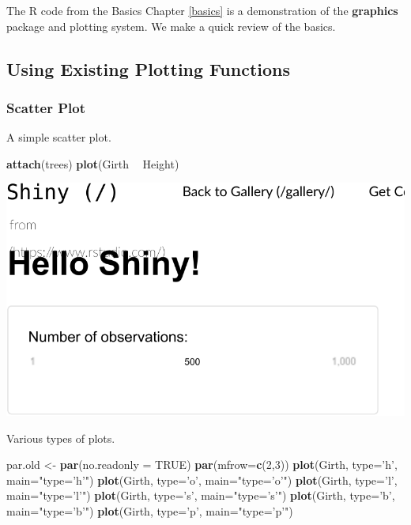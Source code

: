 \documentclass[]{book}
\newenvironment{Shaded}{\begin{snugshade}}{\end{snugshade}}
\newcommand{\DataTypeTok}[1]{\textcolor[rgb]{0.13,0.29,0.53}{#1}}
\newcommand{\DecValTok}[1]{\textcolor[rgb]{0.00,0.00,0.81}{#1}}
\newcommand{\KeywordTok}[1]{\textcolor[rgb]{0.13,0.29,0.53}{\textbf{#1}}}
\newcommand{\NormalTok}[1]{#1}
\newcommand{\OperatorTok}[1]{\textcolor[rgb]{0.81,0.36,0.00}{\textbf{#1}}}
\newcommand{\OtherTok}[1]{\textcolor[rgb]{0.56,0.35,0.01}{#1}}
\newcommand{\StringTok}[1]{\textcolor[rgb]{0.31,0.60,0.02}{#1}}
\theoremstyle{definition}
\theoremstyle{definition}
\theoremstyle{definition}
\theoremstyle{remark}
\begin{document}
The R code from the Basics Chapter \ref{basics} is a demonstration of the \textbf{graphics} package and plotting system.
We make a quick review of the basics.

\hypertarget{using-existing-plotting-functions}{%
\subsection{Using Existing Plotting Functions}\label{using-existing-plotting-functions}}

\hypertarget{scatter-plot}{%
\subsubsection{Scatter Plot}\label{scatter-plot}}

A simple scatter plot.

\begin{Shaded}
\begin{Highlighting}[]
\KeywordTok{attach}\NormalTok{(trees)}
\KeywordTok{plot}\NormalTok{(Girth }\OperatorTok{~}\StringTok{ }\NormalTok{Height)}
\end{Highlighting}
\end{Shaded}

\includegraphics[width=0.5\linewidth]{Rcourse_files/figure-latex/unnamed-chunk-263-1}

Various types of plots.

\begin{Shaded}
\begin{Highlighting}[]
\NormalTok{par.old <-}\StringTok{ }\KeywordTok{par}\NormalTok{(}\DataTypeTok{no.readonly =} \OtherTok{TRUE}\NormalTok{)}
\KeywordTok{par}\NormalTok{(}\DataTypeTok{mfrow=}\KeywordTok{c}\NormalTok{(}\DecValTok{2}\NormalTok{,}\DecValTok{3}\NormalTok{))}
\KeywordTok{plot}\NormalTok{(Girth, }\DataTypeTok{type=}\StringTok{'h'}\NormalTok{, }\DataTypeTok{main=}\StringTok{"type='h'"}\NormalTok{) }
\KeywordTok{plot}\NormalTok{(Girth, }\DataTypeTok{type=}\StringTok{'o'}\NormalTok{, }\DataTypeTok{main=}\StringTok{"type='o'"}\NormalTok{) }
\KeywordTok{plot}\NormalTok{(Girth, }\DataTypeTok{type=}\StringTok{'l'}\NormalTok{, }\DataTypeTok{main=}\StringTok{"type='l'"}\NormalTok{)}
\KeywordTok{plot}\NormalTok{(Girth, }\DataTypeTok{type=}\StringTok{'s'}\NormalTok{, }\DataTypeTok{main=}\StringTok{"type='s'"}\NormalTok{)}
\KeywordTok{plot}\NormalTok{(Girth, }\DataTypeTok{type=}\StringTok{'b'}\NormalTok{, }\DataTypeTok{main=}\StringTok{"type='b'"}\NormalTok{)}
\KeywordTok{plot}\NormalTok{(Girth, }\DataTypeTok{type=}\StringTok{'p'}\NormalTok{, }\DataTypeTok{main=}\StringTok{"type='p'"}\NormalTok{)}
\end{Highlighting}
\end{Shaded}
\end{document}
